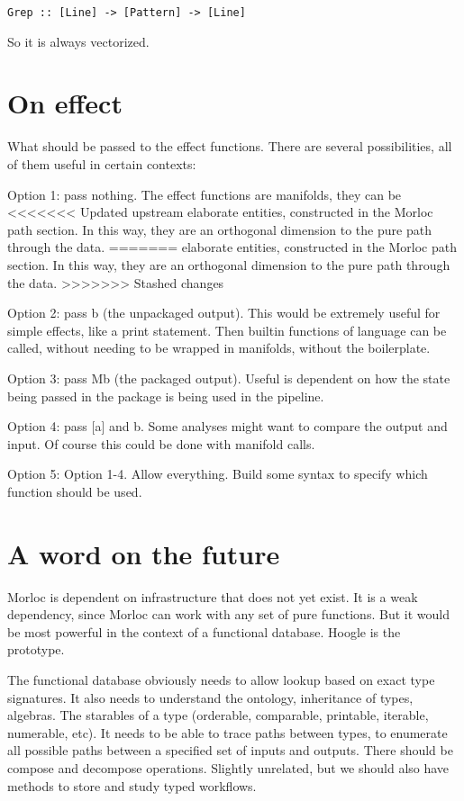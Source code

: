 \documentclass[12pt]{article}
\begin{document}
\begin{verbatim}
Grep :: [Line] -> [Pattern] -> [Line]
\end{verbatim}

So it is always vectorized.

\section{On effect}

What should be passed to the effect functions. There are several possibilities,
all of them useful in certain contexts:

Option 1: pass nothing. The effect functions are manifolds, they can be
<<<<<<< Updated upstream
elaborate entities, constructed in the Morloc path section. In this way, they are
an orthogonal dimension to the pure path through the data.
=======
elaborate entities, constructed in the Morloc path section. In this way, they
are an orthogonal dimension to the pure path through the data.
>>>>>>> Stashed changes

Option 2: pass b (the unpackaged output). This would be extremely useful for
simple effects, like a print statement. Then builtin functions of language can
be called, without needing to be wrapped in manifolds, without the boilerplate.

Option 3: pass Mb (the packaged output). Useful is dependent on how the state
being passed in the package is being used in the pipeline.

Option 4: pass [a] and b. Some analyses might want to compare the output and
input. Of course this could be done with manifold calls.

Option 5: Option 1-4. Allow everything. Build some syntax to specify which
function should be used.

\section{A word on the future}

Morloc is dependent on infrastructure that does not yet exist. It is a weak
dependency, since Morloc can work with any set of pure functions. But it would
be most powerful in the context of a functional database. Hoogle is the
prototype.

The functional database obviously needs to allow lookup based on exact type
signatures. It also needs to understand the ontology, inheritance of types,
algebras. The starables of a type (orderable, comparable, printable, iterable,
numerable, etc). It needs to be able to trace paths between types, to enumerate
all possible paths between a specified set of inputs and outputs. There should
be compose and decompose operations. Slightly unrelated, but we should also
have methods to store and study typed workflows.
\end{document}
